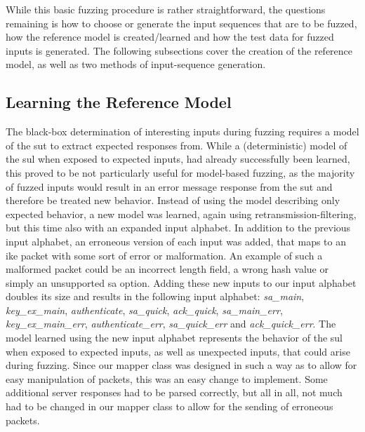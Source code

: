 While this basic fuzzing procedure is rather straightforward, the questions remaining is how to choose or generate the input sequences that are to be fuzzed, how the reference model is created/learned and how the test data for fuzzed inputs is generated. The following subsections cover the creation of the reference model, as well as two methods of input-sequence generation.

\subsection{Learning the Reference Model} \label{subsec:adapting_model}
The black-box determination of interesting inputs during fuzzing requires a model of the \ac{sut} to extract expected responses from. While a (deterministic) model of the \ac{sul} when exposed to expected inputs, had already successfully been learned, this proved to be not particularly useful for model-based fuzzing, as the majority of fuzzed inputs would result in an error message response from the \ac{sut} and therefore be treated new behavior. Instead of using the model describing only expected behavior, a new model was learned, again using retransmission-filtering, but this time also with an expanded input alphabet. In addition to the previous input alphabet, an erroneous version of each input was added, that maps to an \ac{ike} packet with some sort of error or malformation. An example of such a malformed packet could be an incorrect length field, a wrong hash value or simply an unsupported \ac{sa} option. Adding these new inputs to our input alphabet doubles its size and results in the following input alphabet: \emph{sa\_main}, \emph{key\_ex\_main}, \emph{authenticate}, \emph{sa\_quick}, \emph{ack\_quick}, \emph{sa\_main\_err}, \emph{key\_ex\_main\_err}, \emph{authenticate\_err}, \emph{sa\_quick\_err} and \emph{ack\_quick\_err}. The model learned using the new input alphabet represents the behavior of the \ac{sul} when exposed to expected inputs, as well as unexpected inputs, that could arise during fuzzing. Since our mapper class was designed in such a way as to allow for easy manipulation of packets, this was an easy change to implement. Some additional server responses had to be parsed correctly, but all in all, not much had to be changed in our mapper class to allow for the sending of erroneous packets. 


